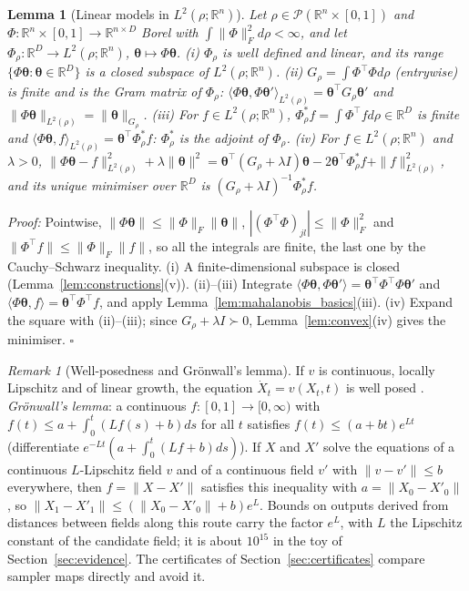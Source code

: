 \documentclass{article}
\newcommand{\RR}{\mathbb{R}}
\newcommand{\bth}{\boldsymbol{\theta}}
\theoremstyle{plain}
\newtheorem{lemma}[theorem]{Lemma}
\theoremstyle{remark}
\newtheorem{remark}[theorem]{Remark}
\begin{document}
\begin{lemma}[Linear models in $L^2(\rho;\RR^n)$]\label{lem:linear_models}
Let $\rho\in\mathcal P(\RR^n\times[0,1])$ and $\Phi:\RR^n\times[0,1]\to\RR^{n\times D}$ Borel with $\int\|\Phi\|_F^2d\rho<\infty$, and let
$\Phi_\rho:\RR^D\to L^2(\rho;\RR^n)$, $\bth\mapsto\Phi\bth$.
(i) $\Phi_\rho$ is well defined and linear, and its range $\{\Phi\bth:\bth\in\RR^D\}$ is a closed subspace of $L^2(\rho;\RR^n)$.
(ii) $G_\rho=\int\Phi^\top\Phi d\rho$ (entrywise) is finite and is the Gram matrix of $\Phi_\rho$: $\langle\Phi\bth,\Phi\bth'\rangle_{L^2(\rho)}=\bth^\top G_\rho\bth'$ and
$\|\Phi\bth\|_{L^2(\rho)}=\|\bth\|_{G_\rho}$.
(iii) For $f\in L^2(\rho;\RR^n)$, $\Phi_\rho^*f=\int\Phi^\top fd\rho\in\RR^D$ is finite and $\langle\Phi\bth,f\rangle_{L^2(\rho)}=\bth^\top\Phi_\rho^*f$: $\Phi^*_\rho$ is the
adjoint of $\Phi_\rho$.
(iv) For $f\in L^2(\rho;\RR^n)$ and $\lambda>0$,
$\|\Phi\bth-f\|^2_{L^2(\rho)}+\lambda\|\bth\|^2=\bth^\top(G_\rho+\lambda I)\bth-2\bth^\top\Phi^*_\rho f+\|f\|^2_{L^2(\rho)}$, and its unique minimiser over $\RR^D$ is
$(G_\rho+\lambda I)^{-1}\Phi^*_\rho f$.
\end{lemma}
\textit{Proof:}
Pointwise, $\|\Phi\bth\|\le\|\Phi\|_F\|\bth\|$, $|(\Phi^\top\Phi)_{jl}|\le\|\Phi\|_F^2$ and $\|\Phi^\top f\|\le\|\Phi\|_F\|f\|$, so all the integrals are finite, the last
one by the Cauchy--Schwarz inequality. (i) A finite-dimensional subspace is closed (Lemma~\ref{lem:constructions}(v)). (ii)--(iii)
Integrate $\langle\Phi\bth,\Phi\bth'\rangle=\bth^\top\Phi^\top\Phi\bth'$ and $\langle\Phi\bth,f\rangle=\bth^\top\Phi^\top f$, and apply
Lemma~\ref{lem:mahalanobis_basics}(iii). (iv) Expand the square with (ii)--(iii); since $G_\rho+\lambda I\succ0$, Lemma~\ref{lem:convex}(iv) gives the
minimiser. \hfill$\square$

\begin{remark}[Well-posedness and Gr\"onwall's lemma]\label{rem:gronwall}
If $v$ is continuous, locally Lipschitz and of linear growth, the equation $\dot X_t=v(X_t,t)$ is well posed
\citep[Ch.~2]{teschl2012ordinary}. \emph{Gr\"onwall's lemma}: a continuous $f:[0,1]\to[0,\infty)$ with $f(t)\le a+\int_0^t(Lf(s)+b)ds$ for all $t$
satisfies $f(t)\le(a+bt)e^{Lt}$ (differentiate $e^{-Lt}(a+\int_0^t(Lf+b)ds)$). If $X$ and $X'$ solve the equations of a continuous $L$-Lipschitz field $v$
and of a continuous field $v'$ with $\|v-v'\|\le b$ everywhere, then $f=\|X-X'\|$ satisfies this inequality with $a=\|X_0-X'_0\|$, so
$\|X_1-X'_1\|\le(\|X_0-X'_0\|+b)e^L$. Bounds on outputs derived from distances between fields along this route carry the factor $e^L$,
with $L$ the Lipschitz constant of the candidate field; it is about $10^{15}$ in the toy of Section~\ref{sec:evidence}. The certificates of
Section~\ref{sec:certificates} compare sampler maps directly and avoid it.
\end{remark}
\end{document}
